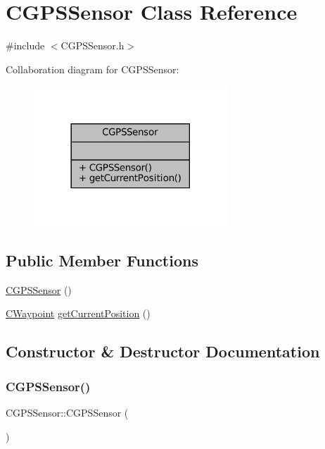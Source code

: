 \hypertarget{classCGPSSensor}{}\section{C\+G\+P\+S\+Sensor Class Reference}
\label{classCGPSSensor}


{\ttfamily \#include $<$C\+G\+P\+S\+Sensor.\+h$>$}



Collaboration diagram for C\+G\+P\+S\+Sensor\+:
\nopagebreak
\begin{figure}[H]
\begin{center}
\leavevmode
\includegraphics[width=206pt]{classCGPSSensor__coll__graph}
\end{center}
\end{figure}
\subsection*{Public Member Functions}
\begin{DoxyCompactItemize}
\item 
\hyperlink{classCGPSSensor_ab9d50cfdb88349ca752423cc6f6796ef}{C\+G\+P\+S\+Sensor} ()
\item 
\hyperlink{classCWaypoint}{C\+Waypoint} \hyperlink{classCGPSSensor_a6a3f3e3070e5f0c566712ea62b652684}{get\+Current\+Position} ()
\end{DoxyCompactItemize}


\subsection{Constructor \& Destructor Documentation}
\mbox{\label{classCGPSSensor_ab9d50cfdb88349ca752423cc6f6796ef}} 
\subsubsection{\texorpdfstring{C\+G\+P\+S\+Sensor()}{CGPSSensor()}}
{\footnotesize\ttfamily C\+G\+P\+S\+Sensor\+::\+C\+G\+P\+S\+Sensor (\begin{DoxyParamCaption}{ }\end{DoxyParamCaption})}

